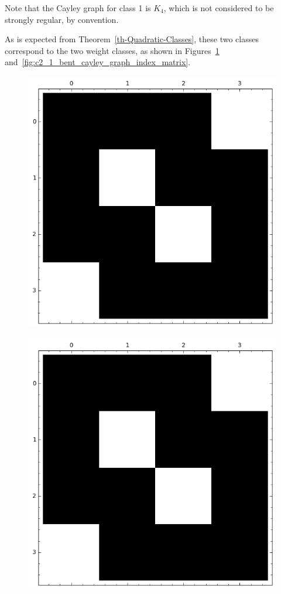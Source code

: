 \documentclass[12pt,a4paper]{article}
\begin{document}
Note that the Cayley graph for class 1 is $K_4$, which is not considered to be strongly regular, by convention.

As is expected from Theorem~\ref{th-Quadratic-Classes}, these two classes correspond to the two weight classes,
as shown in Figures~\ref{fig:c2_1_weight_class_matrix} and~\ref{fig:c2_1_bent_cayley_graph_index_matrix}.
\begin{figure}[!ht]
\centering
\begin{minipage}{.48\textwidth}
  \centering
  \includegraphics[width=.9\linewidth]{../matrix_plot/re2_1_weight_class_matrix.png}
  \label{fig:c2_1_weight_class_matrix}
\end{minipage}%
\begin{minipage}{.48\textwidth}
  \centering
  \includegraphics[width=.9\linewidth]{../matrix_plot/re2_1_bent_cayley_graph_index_matrix.png}

\end{minipage}
\end{figure}
\end{document}
